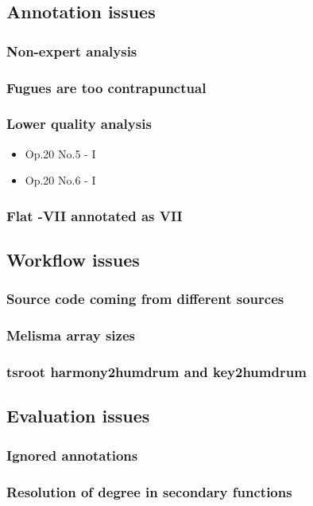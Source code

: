 	\subsection{Annotation issues}
		\subsubsection{Non-expert analysis}
		\subsubsection{Fugues are too contrapunctual}
		\subsubsection{Lower quality analysis}
    \begin{itemize}
    \item Op.20 No.5 - I
		\item Op.20 No.6 - I
    \end{itemize}
		\subsubsection{Flat -VII annotated as VII}
	\subsection{Workflow issues}
		\subsubsection{Source code coming from different sources}
		\subsubsection{Melisma array sizes}
		\subsubsection{tsroot harmony2humdrum and key2humdrum}
	\subsection{Evaluation issues}
		\subsubsection{Ignored annotations}
		\subsubsection{Resolution of degree in secondary functions}
